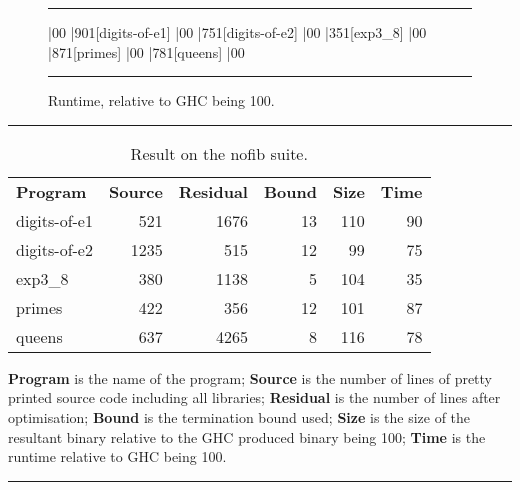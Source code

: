 \documentclass{llncs}
\newenvironment{fig}
    {\begin{figure}[tbp]\hrule}
    {\end{figure}}
\newcommand{\figend}{\hrule}
\begin{document}
\begin{fig}
\vspace{7mm}
\begin{barenv}
 
\bar{0}{0}
\bar{90}{1}[digits-of-e1]
\bar{0}{0}
\bar{75}{1}[digits-of-e2]
\bar{0}{0}
\bar{35}{1}[exp3\_8]
\bar{0}{0}
\bar{87}{1}[primes]
\bar{0}{0}
\bar{78}{1}[queens]
\bar{0}{0}
\end{barenv}
\vspace{3mm}
\figend
\caption{Runtime, relative to GHC being 100.}
\label{fig:haskell_results}
\end{fig}

\begin{table}[tb]
\hrule
\vspace{3mm}

\begin{tabular}{lrrrrr}
\textbf{Program} & \hspace{5mm}\textbf{Source} & \hspace{5mm}\textbf{Residual} & \hspace{5mm}\textbf{Bound} & \hspace{5mm}\textbf{Size} & \hspace{5mm}\textbf{Time} \\
digits-of-e1 &  521 & 1676 & 13 & 110 & 90 \\
digits-of-e2 & 1235 &  515 & 12 &  99 & 75 \\
exp3\_8      &  380 & 1138 &  5 & 104 & 35 \\
primes       &  422 &  356 & 12 & 101 & 87 \\
queens       &  637 & 4265 &  8 & 116 & 78 \\
\end{tabular}
\vspace{2mm}

\textbf{Program} is the name of the program; \textbf{Source} is the number of lines of pretty printed source code including all libraries; \textbf{Residual} is the number of lines after optimisation; \textbf{Bound} is the termination bound used; \textbf{Size} is the size of the resultant binary relative to the GHC produced binary being 100; \textbf{Time} is the runtime relative to GHC being 100.

\vspace{4mm}
\hrule
\vspace{2mm}
\caption{Result on the nofib suite.}
\label{tab:haskell_results}
\end{table}
\end{document}
